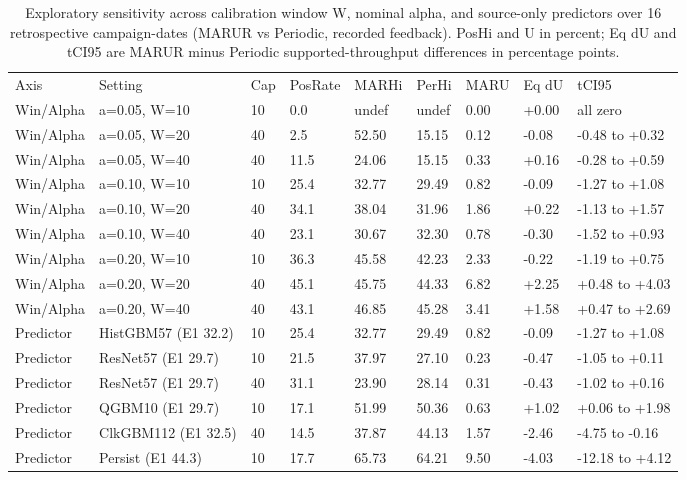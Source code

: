 \begin{table}[!ht]
\centering\footnotesize\setlength{\tabcolsep}{3.5pt}
\caption{Exploratory sensitivity across calibration window W, nominal alpha, and source-only predictors over 16 retrospective campaign-dates (MARUR vs Periodic, recorded feedback). PosHi and U in percent; Eq dU and tCI95 are MARUR minus Periodic supported-throughput differences in percentage points.}
\begin{tabular}{lllllllll}
\hline
Axis & Setting & Cap & PosRate & MARHi & PerHi & MARU & Eq dU & tCI95 \\
Win/Alpha & a=0.05, W=10 & 10 & 0.0 & undef & undef & 0.00 & +0.00 & all zero \\
Win/Alpha & a=0.05, W=20 & 40 & 2.5 & 52.50 & 15.15 & 0.12 & -0.08 & -0.48 to +0.32 \\
Win/Alpha & a=0.05, W=40 & 40 & 11.5 & 24.06 & 15.15 & 0.33 & +0.16 & -0.28 to +0.59 \\
Win/Alpha & a=0.10, W=10 & 10 & 25.4 & 32.77 & 29.49 & 0.82 & -0.09 & -1.27 to +1.08 \\
Win/Alpha & a=0.10, W=20 & 40 & 34.1 & 38.04 & 31.96 & 1.86 & +0.22 & -1.13 to +1.57 \\
Win/Alpha & a=0.10, W=40 & 40 & 23.1 & 30.67 & 32.30 & 0.78 & -0.30 & -1.52 to +0.93 \\
Win/Alpha & a=0.20, W=10 & 10 & 36.3 & 45.58 & 42.23 & 2.33 & -0.22 & -1.19 to +0.75 \\
Win/Alpha & a=0.20, W=20 & 40 & 45.1 & 45.75 & 44.33 & 6.82 & +2.25 & +0.48 to +4.03 \\
Win/Alpha & a=0.20, W=40 & 40 & 43.1 & 46.85 & 45.28 & 3.41 & +1.58 & +0.47 to +2.69 \\
Predictor & HistGBM57 (E1 32.2) & 10 & 25.4 & 32.77 & 29.49 & 0.82 & -0.09 & -1.27 to +1.08 \\
Predictor & ResNet57 (E1 29.7) & 10 & 21.5 & 37.97 & 27.10 & 0.23 & -0.47 & -1.05 to +0.11 \\
Predictor & ResNet57 (E1 29.7) & 40 & 31.1 & 23.90 & 28.14 & 0.31 & -0.43 & -1.02 to +0.16 \\
Predictor & QGBM10 (E1 29.7) & 10 & 17.1 & 51.99 & 50.36 & 0.63 & +1.02 & +0.06 to +1.98 \\
Predictor & ClkGBM112 (E1 32.5) & 40 & 14.5 & 37.87 & 44.13 & 1.57 & -2.46 & -4.75 to -0.16 \\
Predictor & Persist (E1 44.3) & 10 & 17.7 & 65.73 & 64.21 & 9.50 & -4.03 & -12.18 to +4.12 \\
\hline
\end{tabular}
\end{table}
